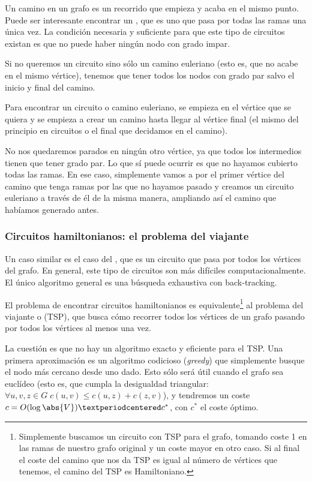 \documentclass[palatino, nochap]{apuntes}
\begin{document}
Un camino en un grafo es un recorrido que empieza y acaba en el mismo punto. Puede ser interesante encontrar un , que es uno que pasa por todas las ramas una única vez. La condición necesaria y suficiente para que este tipo de circuitos existan es que no puede haber ningún nodo con grado impar.

Si no queremos un circuito sino sólo un camino euleriano (esto es, que no acabe en el mismo vértice), tenemos que tener todos los nodos con grado par salvo el inicio y final del camino.

Para encontrar un circuito o camino euleriano, se empieza en el vértice que se quiera y se empieza a crear un camino hasta llegar al vértice final (el mismo del principio en circuitos o el final que decidamos en el camino).

No nos quedaremos parados en ningún otro vértice, ya que todos los intermedios tienen que tener grado par. Lo que sí puede ocurrir es que no hayamos cubierto todas las ramas. En ese caso, simplemente vamos a por el primer vértice del camino que tenga ramas por las que no hayamos pasado y creamos un circuito euleriano a través de él de la misma manera, ampliando así el camino que habíamos generado antes.

\subsubsection{Circuitos hamiltonianos: el problema del viajante}

Un caso similar es el caso del , que es un circuito que pasa por todos los vértices del grafo. En general, este tipo de circuitos son más difíciles computacionalmente. El único algoritmo general es una búsqueda exhaustiva con back-tracking.

El problema de encontrar circuitos hamiltonianos es equivalente\footnote{Simplemente buscamos un circuito con TSP para el grafo, tomando coste 1 en las ramas de nuestro grafo original y un coste mayor en otro caso. Si al final el coste del camino que nos da TSP es igual al número de vértices que tenemos, el camino del TSP es Hamiltoniano.} al problema del viajante o  (TSP), que busca cómo recorrer todos los vértices de un grafo pasando por todos los vértices al menos una vez.

La cuestión es que no hay un algoritmo exacto y eficiente para el TSP. Una primera aproximación es un algoritmo codicioso (\textit{greedy}) que simplemente busque el nodo más cercano desde uno dado. Esto sólo será útil cuando el grafo sea euclídeo (esto es, que cumpla la desigualdad triangular: $∀u,v,z ∈ G\; c(u,v) ≤ c(u,z) + c(z,v)$), y tendremos un coste $c = O(\log \abs{V}) · c^*$, con $c^*$ el coste óptimo.
\end{document}
